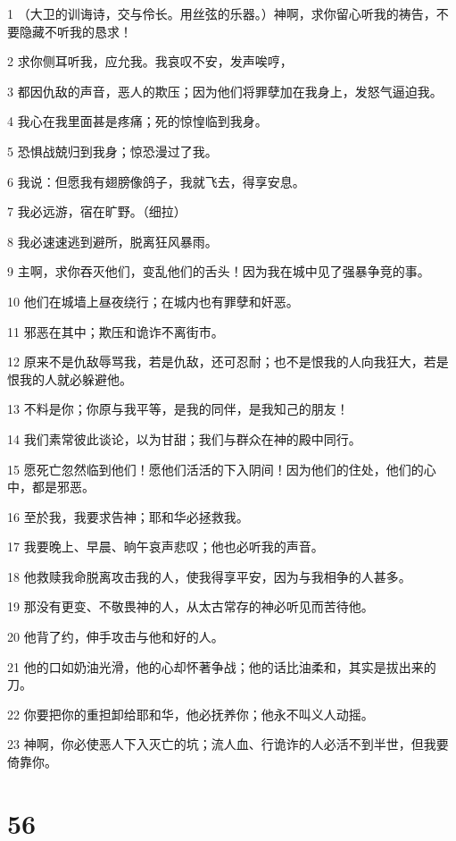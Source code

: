 \par 1 （大卫的训诲诗，交与伶长。用丝弦的乐器。）神啊，求你留心听我的祷告，不要隐藏不听我的恳求！
\par 2 求你侧耳听我，应允我。我哀叹不安，发声唉哼，
\par 3 都因仇敌的声音，恶人的欺压；因为他们将罪孽加在我身上，发怒气逼迫我。
\par 4 我心在我里面甚是疼痛；死的惊惶临到我身。
\par 5 恐惧战兢归到我身；惊恐漫过了我。
\par 6 我说：但愿我有翅膀像鸽子，我就飞去，得享安息。
\par 7 我必远游，宿在旷野。（细拉）
\par 8 我必速速逃到避所，脱离狂风暴雨。
\par 9 主啊，求你吞灭他们，变乱他们的舌头！因为我在城中见了强暴争竞的事。
\par 10 他们在城墙上昼夜绕行；在城内也有罪孽和奸恶。
\par 11 邪恶在其中；欺压和诡诈不离街市。
\par 12 原来不是仇敌辱骂我，若是仇敌，还可忍耐；也不是恨我的人向我狂大，若是恨我的人就必躲避他。
\par 13 不料是你；你原与我平等，是我的同伴，是我知己的朋友！
\par 14 我们素常彼此谈论，以为甘甜；我们与群众在神的殿中同行。
\par 15 愿死亡忽然临到他们！愿他们活活的下入阴间！因为他们的住处，他们的心中，都是邪恶。
\par 16 至於我，我要求告神；耶和华必拯救我。
\par 17 我要晚上、早晨、晌午哀声悲叹；他也必听我的声音。
\par 18 他救赎我命脱离攻击我的人，使我得享平安，因为与我相争的人甚多。
\par 19 那没有更变、不敬畏神的人，从太古常存的神必听见而苦待他。
\par 20 他背了约，伸手攻击与他和好的人。
\par 21 他的口如奶油光滑，他的心却怀著争战；他的话比油柔和，其实是拔出来的刀。
\par 22 你要把你的重担卸给耶和华，他必抚养你；他永不叫义人动摇。
\par 23 神啊，你必使恶人下入灭亡的坑；流人血、行诡诈的人必活不到半世，但我要倚靠你。

\chapter{56}


